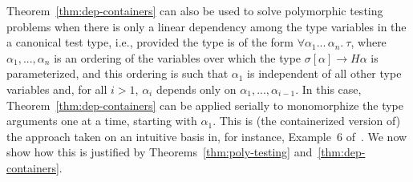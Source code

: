 \documentclass{article}[12 pt]
\theoremstyle{problemstyle}
\begin{document}
Theorem~\ref{thm:dep-containers} can also be used to solve polymorphic
testing problems when there is only a linear dependency among the type
variables in the a canonical test type, i.e., provided the type is of
the form $\forall \alpha_1 ... \,\alpha_n.~\tau$, where
$\alpha_1,...,\alpha_n$ is an ordering of the variables over which the
type $\sigma[\alpha] \rightarrow H \alpha$ is parameterized, and this
ordering is such that $\alpha_1$ is independent of all other type
variables and, for all $i > 1$, $\alpha_i$ depends only on
$\alpha_1,...,\alpha_{i-1}$. In this case,
Theorem~\ref{thm:dep-containers} can be applied serially to
monomorphize the type arguments one at a time, starting with
$\alpha_1$. This is (the containerized version of) the approach taken
on an intuitive basis in, for instance, Example~6 of~\cite{bjc10}. We
now show how this is justified by Theorems~\ref{thm:poly-testing}
and~\ref{thm:dep-containers}.
\end{document}
